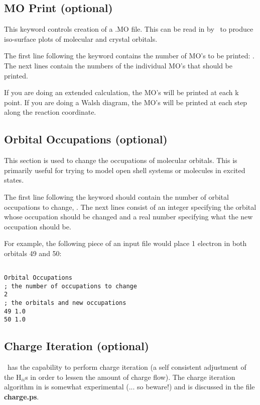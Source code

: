 \subsection{{\sf MO Print} (optional)}

This keyword controls creation of a .MO file.  This can be read in by
\viewprog\ to produce iso-surface plots of molecular and crystal
orbitals.

The first line following the keyword contains the number of MO's to be
printed: .  The next  lines contain the
numbers of the individual MO's that should be printed.

If you are doing an extended calculation, the MO's will be printed at
each k point.  If you are doing a Walsh diagram, the MO's will be
printed at each step along the reaction coordinate.  


\subsection{{\sf Orbital Occupations} (optional)}
This section is used to change the occupations of molecular orbitals.
This is primarily useful for trying to model open shell systems or
molecules in excited states.  

The first line following the keyword should contain the number of
orbital occupations to change, .  The next
 lines consist of an integer specifying the orbital
whose occupation should be changed and a real number specifying what
the new occupation should be.

For example, the following piece of an input file would place 1
electron in both orbitals 49 and 50:

\shrinkspacing
\begin{verbatim}

Orbital Occupations
; the number of occupations to change
2
; the orbitals and new occupations
49 1.0
50 1.0
\end{verbatim}
\resumespacing

\subsection{{\sf Charge Iteration} (optional)}

\calcprog\ has the capability to perform charge iteration
(a self consistent adjustment of the H$_{ii}$s in order to lessen the
amount of charge flow).  
The charge iteration algorithm in \calcprog is somewhat experimental (... so beware!) and is discussed in the file {\bf charge.ps}.

